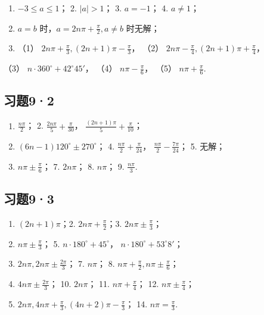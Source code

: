 \begin{enumerate}
\item
  \(-3 \leqslant a \leqslant 1\)； 2. \(|a| > 1\)； 3. \(a = -1\)； 4.
  \(a \neq 1\)；
\item
  \(a = b\) 时，\(a = 2n\pi + \frac{\pi}{2}, a \neq b\) 时无解；
\item
  （1） \(2n\pi + \frac{\pi}{3}, (2n + 1)\pi - \frac{\pi}{3}\)， （2）
  \(2n\pi - \frac{\pi}{4}, (2n + 1)\pi + \frac{\pi}{4}\)，
\end{enumerate}

（3） \(n \cdot 360^{\circ} + 42^{\circ}45'\)， （4）
\(n\pi - \frac{\pi}{6}\)， （5） \(n\pi + \frac{\pi}{6}\).

\subsection{习题9·2}

\begin{enumerate}
\item
  \(\frac{n\pi}{2}\)； 2. \(\frac{2n\pi}{5} + \frac{\pi}{30}\)，
  \(\frac{(2n + 1)\pi}{5} + \frac{\pi}{10}\)；
\item
  \((6n - 1)120^{\circ} \pm 270^{\circ}\)； 4.
  \(\frac{n\pi}{2} + \frac{\pi}{24}\)，
  \(\frac{n\pi}{2} - \frac{7\pi}{24}\)； 5. 无解；
\item
  \(n\pi \pm \frac{\pi}{6}\)； 7. \(2n\pi\)； 8. \(n\pi\)； 9.
  \(\frac{n\pi}{3}\).
\end{enumerate}

\subsection{习题9·3}

\begin{enumerate}
\item
  \((2n + 1)\pi\)；2. \(2n\pi + \frac{\pi}{2}\)；3.
  \(2n\pi \pm \frac{\pi}{3}\)；
\item
  \(n\pi \pm \frac{\pi}{3}\)； 5. \(n \cdot 180^{\circ} + 45^{\circ}\)，
  \(n \cdot 180^{\circ} + 53^{\circ}8'\)；
\item
  \(2n\pi, 2n\pi \pm \frac{2\pi}{3}\)； 7. \(n\pi\)； 8.
  \(n\pi + \frac{\pi}{2}, n\pi \pm \frac{\pi}{6}\)；
\item
  \(4n\pi \pm \frac{2\pi}{3}\)； 10. \(2n\pi\)； 11.
  \(n\pi + \frac{\pi}{4}\)； 12. \(n\pi \pm \frac{\pi}{4}\)；
\item
  \(2n\pi, 4n\pi + \frac{\pi}{3}, (4n + 2)\pi - \frac{\pi}{3}\)； 14.
  \(n\pi = \frac{\pi}{3}\).
\end{enumerate}

